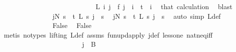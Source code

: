 \begin{isabellebody}
\ \ \ \ \ \ \ \ \ \ \ \ \isamarkupfalse%
\isanewline
\isanewline
\ \ \ \ \ \ \ \ \ \ \ \ \isamarkupfalse%
\ \isamarkupfalse%
\ {\isachardoublequoteopen}L\ i\ j\ {\isacharequal}{\kern0pt}\ f\ j{\isachardoublequoteclose}\ \ {\isachardoublequoteopen}i\ {\isacharless}{\kern0pt}\ t{\isachardoublequoteclose}\ \ i\ \isamarkupfalse%
\ that\ calculation\ \isamarkupfalse%
\ blast\isanewline
\ \ \ \ \ \ \ \ \ \ \ \ \isamarkupfalse%
\ \isamarkupfalse%
\ {\isachardoublequoteopen}{\isacharparenleft}{\kern0pt}{\isasymexists}j{\isacharless}{\kern0pt}N{\isacharprime}{\kern0pt}{\isachardot}{\kern0pt}\ {\isacharparenleft}{\kern0pt}{\isasymforall}s\ {\isacharless}{\kern0pt}\ t{\isachardot}{\kern0pt}\ L\ s\ j\ {\isacharequal}{\kern0pt}\ s{\isacharparenright}{\kern0pt}{\isacharparenright}{\kern0pt}{\isachardoublequoteclose}\ \isamarkupfalse%
\ {\isacartoucheopen}{\isacharparenleft}{\kern0pt}{\isasymexists}j{\isacharless}{\kern0pt}N{\isacharprime}{\kern0pt}{\isachardot}{\kern0pt}\ {\isacharparenleft}{\kern0pt}{\isasymforall}s\ {\isacharless}{\kern0pt}\ t{\isachardot}{\kern0pt}\ L{\isacharprime}{\kern0pt}\ s\ j\ {\isacharequal}{\kern0pt}\ s{\isacharparenright}{\kern0pt}{\isacharparenright}{\kern0pt}{\isacartoucheclose}\ \isamarkupfalse%
\ {\isacharparenleft}{\kern0pt}auto\ simp{\isacharcolon}{\kern0pt}\ L{\isacharprime}{\kern0pt}{\isacharunderscore}{\kern0pt}def{\isacharparenright}{\kern0pt}\isanewline
\ \ \ \ \ \ \ \ \ \ \ \ \isamarkupfalse%
\ \isamarkupfalse%
\ False\ \isamarkupfalse%
\ False\isanewline
\ \ \ \ \ \ \ \ \ \ \ \ \ \ \isamarkupfalse%
\ {\isacharparenleft}{\kern0pt}metis\ {\isacharparenleft}{\kern0pt}no{\isacharunderscore}{\kern0pt}types{\isacharcomma}{\kern0pt}\ lifting{\isacharparenright}{\kern0pt}\ L{\isacharprime}{\kern0pt}{\isacharunderscore}{\kern0pt}def\ assms{\isacharparenleft}{\kern0pt}{}{\isacharparenright}{\kern0pt}\ fun{\isacharunderscore}{\kern0pt}upd{\isacharunderscore}{\kern0pt}apply\ j{\isacharunderscore}{\kern0pt}def\ less{\isacharunderscore}{\kern0pt}one\ nat{\isacharunderscore}{\kern0pt}neq{\isacharunderscore}{\kern0pt}iff{\isacharparenright}{\kern0pt}\isanewline
\ \ \ \ \ \ \ \ \ \ \isamarkupfalse%
\isanewline
\ \ \ \ \ \ \ \ \ \ \isamarkupfalse%
\ \isamarkupfalse%
\ {\isachardoublequoteopen}j\ {\isasymin}\ B\ {}{\isachardoublequoteclose}\ \isamarkupfalse%

\end{isabellebody}
